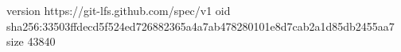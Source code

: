 version https://git-lfs.github.com/spec/v1
oid sha256:33503ffdecd5f524ed726882365a4a7ab478280101e8d7cab2a1d85db2455aa7
size 43840
